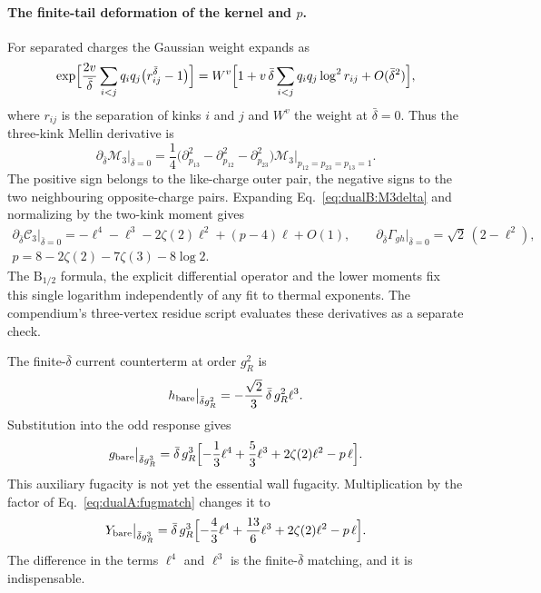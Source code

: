 \documentclass[11pt,a4paper]{article}
\numberwithin{equation}{section}
\newcommand{\db}{\bar\delta}
\begin{document}
\paragraph{The finite-tail deformation of the kernel and $p$.} For separated charges the Gaussian weight expands as
\begin{equation}
 \exp\Bigl[\frac{2v}{\db}\sum_{i<j}q_iq_j\bigl(r_{ij}^{\db}-1\bigr)\Bigr]
 =W^v\Bigl[1+v\,\db\sum_{i<j}q_iq_j\log^2r_{ij}+O(\db^2)\Bigr],
\end{equation}
where $r_{ij}$ is the separation of kinks $i$ and $j$ and $W^v$ the weight at $\db=0$. Thus the three-kink Mellin
derivative is
\begin{equation}
 \partial_{\db}\mathcal M_3\big|_{\db=0}=\frac14\bigl(\partial_{p_{13}}^2-\partial_{p_{12}}^2-\partial_{p_{23}}^2\bigr)
 \mathcal M_3\big|_{p_{12}=p_{23}=p_{13}=1}.
 \label{eq:dualB:M3delta}
\end{equation}
The positive sign belongs to the like-charge outer pair, the negative signs to the two neighbouring opposite-charge
pairs. Expanding Eq.~\eqref{eq:dualB:M3delta} and normalizing by the two-kink moment gives
\begin{equation}
\begin{gathered}
 \partial_{\db}\mathcal C_3\big|_{\db=0}=-\ell^4-\ell^3-2\zeta(2)\ell^2+(p-4)\ell+O(1),\qquad
 \partial_{\db}\Gamma_{gh}\big|_{\db=0}=\sqrt2\,(2-\ell^2),\\
 p=8-2\zeta(2)-7\zeta(3)-8\log2.
\end{gathered}
\label{eq:dualB:panswer}
\end{equation}
The $\mathrm B_{1/2}$ formula, the explicit differential operator and the lower moments fix this single logarithm
independently of any fit to thermal exponents. The compendium's three-vertex residue script evaluates these
derivatives as a separate check.

The finite-$\db$ current counterterm at order $g_R^2$ is
\begin{equation}
 h_{\rm bare}\big|_{\db g_R^2}=-\frac{\sqrt2}{3}\,\db\,g_R^2\ell^3.
\end{equation}
Substitution into the odd response gives
\begin{equation}
 g_{\rm bare}\big|_{\db g_R^3}=\db\,g_R^3\Bigl[-\frac13\ell^4+\frac53\ell^3+2\zeta(2)\ell^2-p\,\ell\Bigr].
 \label{eq:dualB:auxDeltaCt}
\end{equation}
This auxiliary fugacity is not yet the essential wall fugacity. Multiplication by the factor of
Eq.~\eqref{eq:dualA:fugmatch} changes it to
\begin{equation}
 Y_{\rm bare}\big|_{\db g_R^3}=\db\,g_R^3\Bigl[-\frac43\ell^4+\frac{13}{6}\ell^3+2\zeta(2)\ell^2-p\,\ell\Bigr].
 \label{eq:dualB:physicalDeltaCt}
\end{equation}
The difference in the terms $\ell^4$ and $\ell^3$ is the finite-$\db$ matching, and it is indispensable.
\end{document}
